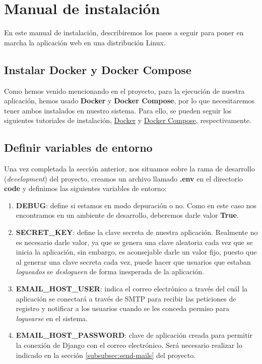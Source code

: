 \chapter{Manual de instalación}
En este manual de instalación, describiremos los pasos a seguir para poner en marcha la
aplicación web en una distribución Linux.


\section{Instalar Docker y Docker Compose}
Como hemos venido mencionando en el proyecto, para la ejecución de nuestra aplicación,
hemos usado \textbf{Docker} y \textbf{Docker Compose}, por lo que necesitaremos tener
ambos instalados en nuestro sistema. Para ello, se pueden seguir los siguientes tutoriales
de instalación, \href{https://docs.docker.com/engine/install/ubuntu/}{Docker} y
\href{https://docs.docker.com/compose/install/}{Docker Compose}, respectivamente. \\

\section{Definir variables de entorno}
Una vez completada la sección anterior, nos situamos sobre la rama de desarrollo
(\textit{development}) del proyecto, creamos un archivo llamado \textbf{.env} en
el directorio \textbf{code} y definimos las siguientes variables de entorno:
    \begin{enumerate}
        \item \textbf{DEBUG}: define si estamos en modo depuración o no. Como en este caso
        nos encontramos en un ambiente de desarrollo, deberemos darle valor \textbf{True}.

        \item \textbf{SECRET\_KEY}: define la clave secreta de nuestra aplicación. Realmente
        no es necesario darle valor, ya que se genera una clave aleatoria cada vez que se
        inicia la aplicación, sin embargo, es aconsejable darle un valor fijo, puesto que
        al generar una clave secreta cada vez, puede hacer que usuarios que estaban
        \textit{logueados} se \textit{deslogueen} de forma inesperada de la aplicación.

        \item \textbf{EMAIL\_HOST\_USER}: indica el correo electrónico a través del cuál la
        aplicación se conectará a través de SMTP para recibir las peticiones de registro y
        notificar a los usuarios cuando se les conceda permiso para \textit{loguearse} en
        el sistema.

        \item \textbf{EMAIL\_HOST\_PASSWORD}: clave de aplicación creada para permitir la
        conexión de Django con el correo electrónico. Será necesario realizar lo indicado
        en la sección \ref{subsubsec:send-mails} del proyecto.
    \end{enumerate}

